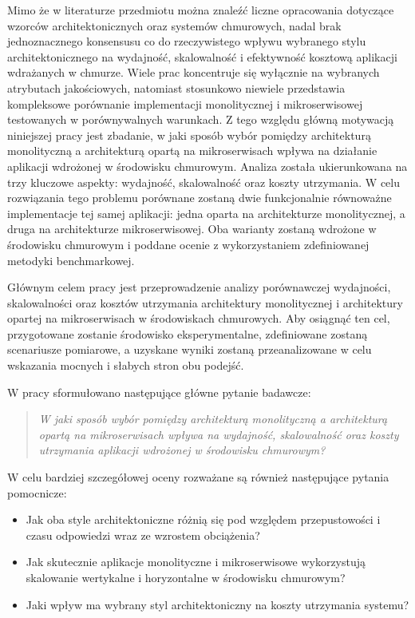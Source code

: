 Mimo że w literaturze przedmiotu można znaleźć liczne opracowania dotyczące wzorców architektonicznych oraz systemów chmurowych, nadal brak jednoznacznego konsensusu co do rzeczywistego wpływu wybranego stylu architektonicznego na wydajność, skalowalność i efektywność kosztową aplikacji wdrażanych w chmurze\cite{francesco2019architecting,li2021microservices,rodrigues2025assessment}. Wiele prac koncentruje się wyłącznie na wybranych atrybutach jakościowych, natomiast stosunkowo niewiele przedstawia kompleksowe porównanie implementacji monolitycznej i mikroserwisowej testowanych w porównywalnych warunkach\cite{avritzer2020scalability,tapia2020monolithic,blinowski2022monolithic}. Z tego względu główną motywacją niniejszej pracy jest zbadanie, w jaki sposób wybór pomiędzy architekturą monolityczną a architekturą opartą na mikroserwisach wpływa na działanie aplikacji wdrożonej w środowisku chmurowym. Analiza została ukierunkowana na trzy kluczowe aspekty: wydajność, skalowalność oraz koszty utrzymania. W celu rozwiązania tego problemu porównane zostaną dwie funkcjonalnie równoważne implementacje tej samej aplikacji: jedna oparta na architekturze monolitycznej, a druga na architekturze mikroserwisowej. Oba warianty zostaną wdrożone w środowisku chmurowym i poddane ocenie z wykorzystaniem zdefiniowanej metodyki benchmarkowej.

Głównym celem pracy jest przeprowadzenie analizy porównawczej wydajności, skalowalności oraz kosztów utrzymania architektury monolitycznej i architektury opartej na mikroserwisach w środowiskach chmurowych. Aby osiągnąć ten cel, przygotowane zostanie środowisko eksperymentalne, zdefiniowane zostaną scenariusze pomiarowe, a uzyskane wyniki zostaną przeanalizowane w celu wskazania mocnych i słabych stron obu podejść.

W pracy sformułowano następujące główne pytanie badawcze:
\begin{quote}
\textit{W jaki sposób wybór pomiędzy architekturą monolityczną a architekturą opartą na mikroserwisach wpływa na wydajność, skalowalność oraz koszty utrzymania aplikacji wdrożonej w środowisku chmurowym?}
\end{quote}

W celu bardziej szczegółowej oceny rozważane są również następujące pytania pomocnicze:
\begin{itemize}
    \item Jak oba style architektoniczne różnią się pod względem przepustowości i czasu odpowiedzi wraz ze wzrostem obciążenia?
    \item Jak skutecznie aplikacje monolityczne i mikroserwisowe wykorzystują skalowanie wertykalne i horyzontalne w środowisku chmurowym?
    \item Jaki wpływ ma wybrany styl architektoniczny na koszty utrzymania systemu?
\end{itemize}

